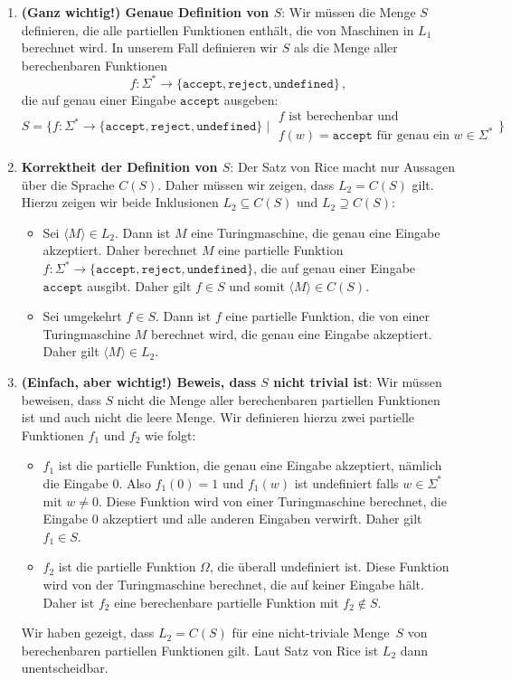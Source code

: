 \documentclass[a4paper,11pt,oneside,ngerman]{scrartcl}
\begin{document}
\begin{enumerate}
    \item \textbf{(Ganz wichtig!) Genaue Definition von $S$}: 
Wir müssen die Menge $S$ definieren, die alle partiellen Funktionen enthält, die von Maschinen in $L_1$ berechnet wird.
In unserem Fall definieren wir $S$ als die Menge aller berechenbaren Funktionen \[f\colon\Sigma^\ast\to\{\texttt{accept},\texttt{reject},\texttt{undefined}\}\,,\] die auf genau einer Eingabe $\texttt{accept}$ ausgeben:
\[
    S = \Big\{
        f\colon\Sigma^\ast\to\{\texttt{accept},\texttt{reject},\texttt{undefined}\}
        \;\Big|\;
        \substack{\text{$f$ ist berechenbar und}\\\text{$f(w)=\texttt{accept}$ für genau ein $w\in\Sigma^\ast$}}
        \Big\}
    \]


\item \textbf{Korrektheit der Definition von $S$}:
Der Satz von Rice macht nur Aussagen über die Sprache $C(S)$. Daher müssen wir zeigen, dass $L_2=C(S)$ gilt. Hierzu zeigen wir beide Inklusionen $L_2\subseteq C(S)$ und $L_2\supseteq C(S)$:
\begin{itemize}
    \item Sei $\langle M \rangle\in L_2$. Dann ist $M$ eine Turingmaschine, die genau eine Eingabe akzeptiert. Daher berechnet $M$ eine partielle Funktion $f\colon\Sigma^\ast\to\{\texttt{accept},\texttt{reject},\texttt{undefined}\}$, die auf genau einer Eingabe $\texttt{accept}$ ausgibt. Daher gilt $f\in S$ und somit $\langle M \rangle\in C(S)$.
    \item Sei umgekehrt $f\in S$. Dann ist $f$ eine partielle Funktion, die von einer Turingmaschine $M$ berechnet wird, die genau eine Eingabe akzeptiert. Daher gilt $\langle M \rangle\in L_2$.
\end{itemize}

\item \textbf{(Einfach, aber wichtig!) Beweis, dass $S$ nicht trivial ist}:
Wir müssen beweisen, dass $S$ nicht die Menge aller berechenbaren partiellen Funktionen ist und auch nicht die leere Menge.
Wir definieren hierzu zwei partielle Funktionen $f_1$ und $f_2$ wie folgt:
\begin{itemize}
    \item $f_1$ ist die partielle Funktion, die genau eine Eingabe akzeptiert, nämlich die Eingabe $0$. Also $f_1(0)=1$ und $f_1(w)$ ist undefiniert falls $w\in\Sigma^\ast$ mit $w\neq 0$. Diese Funktion wird von einer Turingmaschine berechnet, die Eingabe $0$ akzeptiert und alle anderen Eingaben verwirft. Daher gilt $f_1\in S$.
    \item $f_2$ ist die partielle Funktion $\Omega$, die überall undefiniert ist. Diese Funktion wird von der Turingmaschine berechnet, die auf keiner Eingabe hält. Daher ist $f_2$ eine berechenbare partielle Funktion mit $f_2\notin S$.
\end{itemize}
Wir haben gezeigt, dass $L_2=C(S)$ für eine nicht-triviale Menge~$S$ von berechenbaren partiellen Funktionen gilt. Laut Satz von Rice ist $L_2$ dann unentscheidbar.
\end{enumerate}
\end{document}
